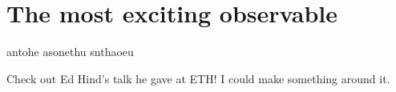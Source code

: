 \chapter{The most exciting observable}
\label{ch:nedm-at-psi}

antohe asonethu snthaoeu

Check out Ed Hind's talk he gave at ETH! I could make something around it.
